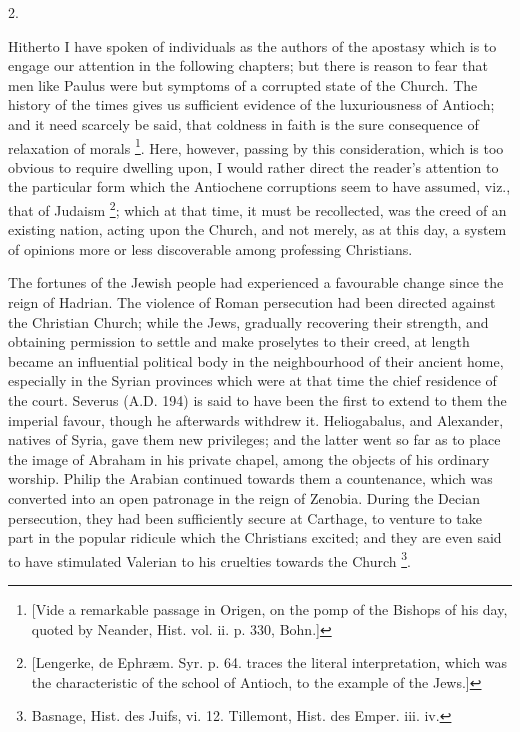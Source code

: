 2.

Hitherto I have spoken of individuals as the authors of the
apostasy which is to engage our attention in the following chapters;
but there is reason to fear that men like Paulus were but symptoms of
a corrupted state of the Church. The history of the times gives us
sufficient evidence of the luxuriousness of Antioch; and it need
scarcely be said, that coldness in faith is the sure consequence of
relaxation of morals \footnote{[Vide a remarkable passage in Origen, on
the pomp of the Bishops of his day, quoted by Neander, Hist. vol. ii.
p. 330, Bohn.]}.
Here, however, passing by this consideration, which is too obvious to
require dwelling upon, I would rather direct the reader's attention to
the particular form which the Antiochene corruptions seem to have
assumed, viz., that of Judaism \footnote{[Lengerke, de Ephræm. Syr. p. 64. traces
the literal interpretation, which was the characteristic of the school
of Antioch, to the example of the Jews.]}; which at that time, it must be recollected, was the
creed of an existing nation, acting upon the Church, and not merely,
as at this day, a system of opinions more or less discoverable among
professing Christians.

The fortunes of the Jewish people had experienced a favourable
change since the reign of Hadrian. The violence of Roman persecution
had been directed against the Christian Church; while the Jews,
gradually recovering their strength, and obtaining permission to
settle and make proselytes to their creed, at length became an
influential political body in the neighbourhood of their ancient home,
especially in the Syrian provinces which were at that time the chief
residence of the court. Severus (A.D. 194) is
said to have been the first to extend to them the imperial favour,
though he afterwards withdrew it. Heliogabalus, and Alexander, natives
of Syria, gave them new privileges; and the latter went so far as to
place the image of Abraham in his private chapel, among the objects of
his ordinary worship. Philip the Arabian continued towards them a
countenance, which was converted into an open patronage in the reign
of Zenobia. During the Decian persecution, they had been sufficiently
secure at Carthage, to venture to take part in the popular ridicule
which the Christians excited; and they are even said to have
stimulated Valerian to his cruelties towards the Church \footnote{Basnage, Hist. des Juifs, vi. 12.
Tillemont, Hist. des Emper. iii. iv.}.

